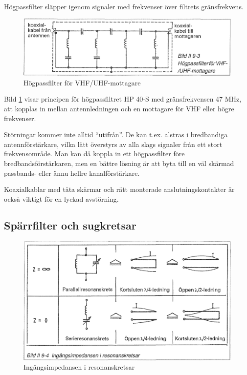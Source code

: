 Högpassfilter släpper igenom signaler med frekvenser över filtrets
gränsfrekvens.

\begin{figure}
  \includegraphics[width=\textwidth]{images/bild_2_9-03}
  \caption{Högpassfilter för VHF/UHF-mottagare}
  \label{fig:bildII9-3}
\end{figure}

Bild \ref{fig:bildII9-3} visar principen för högpassfiltret HP 40-S med
gränsfrekvensen 47 MHz, att kopplas in mellan antennledningen och en
mottagare för VHF eller högre frekvenser.

Störningar kommer inte alltid ``utifrån''.  De kan t.ex. alstras i
bredbandiga antennförstärkare, vilka lätt överstyrs av alla slags
signaler från ett stort frekvensområde. Man kan då koppla in ett
högpassfilter före bredbandsförstärkaren, men en bättre lösning är att
byta till en väl skärmad passbands- eller ännu hellre
kanalförstärkare.

Koaxialkablar med täta skärmar och rätt monterade anslutningskontakter
är också viktigt för en lyckad avstörning.

\subsection{Spärrfilter och sugkretsar}

\begin{figure}
  \includegraphics[width=\textwidth]{images/bild_2_9-04}
  \caption{Ingångsimpedansen i resonanskretsar}
  \label{fig:bildII9-4}
\end{figure}

